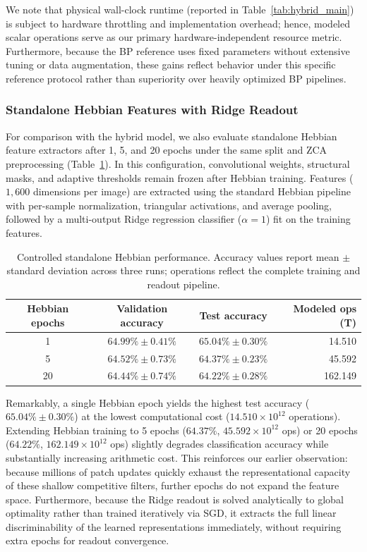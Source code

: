 \documentclass{article}
\begin{document}
{    We note that physical wall-clock runtime (reported in Table~\ref{tab:hybrid_main}) is subject to hardware throttling and implementation overhead; hence, modeled scalar operations serve as our primary hardware-independent resource metric. Furthermore, because the BP reference uses fixed parameters without extensive tuning or data augmentation, these gains reflect behavior under this specific reference protocol rather than superiority over heavily optimized BP pipelines.

    \subsubsection{Standalone Hebbian Features with Ridge Readout}

    For comparison with the hybrid model, we also evaluate standalone Hebbian feature extractors after 1, 5, and 20 epochs under the same split and ZCA preprocessing (Table~\ref{tab:standalone_hebb}). In this configuration, convolutional weights, structural masks, and adaptive thresholds remain frozen after Hebbian training. Features ($1,600$ dimensions per image) are extracted using the standard Hebbian pipeline with per-sample normalization, triangular activations, and average pooling, followed by a multi-output Ridge regression classifier ($\alpha=1$) fit on the training features.

    \begin{table}[!htbp]
    \color{red}
    \centering
    \small
    \caption{Controlled standalone Hebbian performance. Accuracy values report mean $\pm$ standard deviation across three runs; operations reflect the complete training and readout pipeline.}
    \label{tab:standalone_hebb}
    \begin{tabular}{c c c r}
    \toprule
    Hebbian epochs & Validation accuracy & Test accuracy & Modeled ops (T) \\
    \midrule
    1  & $64.99\% \pm 0.41\%$ & $65.04\% \pm 0.30\%$ & 14.510 \\
    5  & $64.52\% \pm 0.73\%$ & $64.37\% \pm 0.23\%$ & 45.592 \\
    20 & $64.44\% \pm 0.74\%$ & $64.22\% \pm 0.28\%$ & 162.149 \\
    \bottomrule
    \end{tabular}
    \end{table}

    Remarkably, a single Hebbian epoch yields the highest test accuracy ($65.04\% \pm 0.30\%$) at the lowest computational cost ($14.510 \times 10^{12}$ operations). Extending Hebbian training to 5 epochs ($64.37\%$, $45.592 \times 10^{12}$ ops) or 20 epochs ($64.22\%$, $162.149 \times 10^{12}$ ops) slightly degrades classification accuracy while substantially increasing arithmetic cost. This reinforces our earlier observation: because millions of patch updates quickly exhaust the representational capacity of these shallow competitive filters, further epochs do not expand the feature space. Furthermore, because the Ridge readout is solved analytically to global optimality rather than trained iteratively via SGD, it extracts the full linear discriminability of the learned representations immediately, without requiring extra epochs for readout convergence.

}
\end{document}
